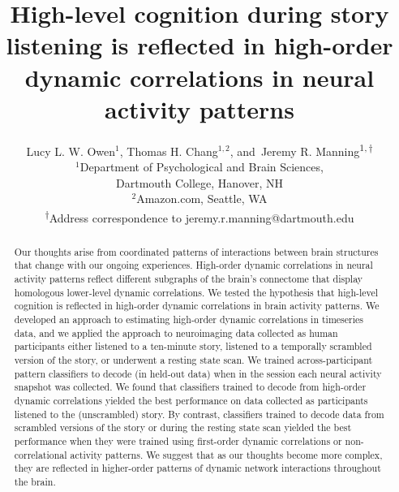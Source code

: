\documentclass[english]{article}
\title{High-level cognition during story listening is reflected in
  high-order dynamic correlations in neural activity patterns}
\author{Lucy L. W. Owen$^1$, Thomas H. Chang$^{1,2}$, and\
  Jeremy R. Manning\textsuperscript{$1, \dagger$}\\
  [0.1in]$^1$Department of Psychological and Brain
  Sciences,\\Dartmouth
  College, Hanover, NH\\
  $^2$Amazon.com, Seattle, WA\\
  \textsuperscript{$\dagger$}Address correspondence to
  jeremy.r.manning@dartmouth.edu}
\begin{document}
\maketitle


\begin{abstract}
  Our thoughts arise from coordinated patterns of interactions between
  brain structures that change with our ongoing experiences.
  High-order dynamic correlations in neural activity patterns reflect
  different subgraphs of the brain's connectome that display
  homologous lower-level dynamic correlations.  We tested the
  hypothesis that high-level cognition is reflected in high-order
  dynamic correlations in brain activity patterns.  We developed an
  approach to estimating high-order dynamic correlations in timeseries
  data, and we applied the approach to neuroimaging data collected as
  human participants either listened to a ten-minute story, listened
  to a temporally scrambled version of the story, or underwent a
  resting state scan.  We trained across-participant pattern
  classifiers to decode (in held-out data) when in the session each
  neural activity snapshot was collected.  We found that classifiers
  trained to decode from high-order dynamic correlations yielded the
  best performance on data collected as participants listened to the
  (unscrambled) story.  By contrast, classifiers trained to decode
  data from scrambled versions of the story or during the resting
  state scan yielded the best performance when they were trained using
  first-order dynamic correlations or non-correlational activity patterns.  We
  suggest that as our thoughts become more complex, they are reflected
  in higher-order patterns of dynamic network interactions throughout
  the brain.
\end{abstract}

\doublespacing
\end{document}
